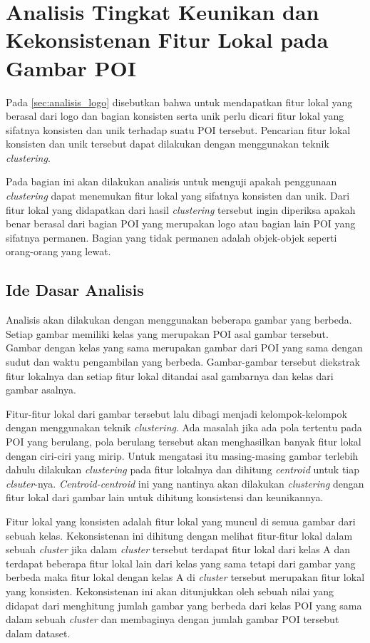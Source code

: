 \section{Analisis Tingkat Keunikan dan Kekonsistenan Fitur Lokal pada Gambar POI}
\label{sec:analisis_sifat}
Pada \ref{sec:analisis_logo} disebutkan bahwa untuk mendapatkan fitur lokal yang berasal dari logo dan bagian konsisten serta unik perlu dicari fitur lokal yang sifatnya konsisten dan unik terhadap suatu POI tersebut. Pencarian fitur lokal konsisten dan unik tersebut dapat dilakukan dengan menggunakan teknik \textit{clustering}. 

Pada bagian ini akan dilakukan analisis untuk menguji apakah penggunaan \textit{clustering} dapat menemukan fitur lokal yang sifatnya konsisten dan unik. Dari fitur lokal yang didapatkan dari hasil \textit{clustering} tersebut ingin diperiksa apakah benar berasal dari bagian POI yang merupakan logo atau bagian lain POI yang sifatnya permanen. Bagian yang tidak permanen adalah objek-objek seperti orang-orang yang lewat.

\subsection{Ide Dasar Analisis}
\label{subsec:ide_analisis_clustering}
Analisis akan dilakukan dengan menggunakan beberapa gambar yang berbeda. Setiap gambar memiliki kelas yang merupakan POI asal gambar tersebut. Gambar dengan kelas yang sama merupakan gambar dari POI yang sama dengan sudut dan waktu pengambilan yang berbeda. Gambar-gambar tersebut diekstrak fitur lokalnya dan setiap fitur lokal ditandai asal gambarnya dan kelas dari gambar asalnya. 

Fitur-fitur lokal dari gambar tersebut lalu dibagi menjadi kelompok-kelompok dengan menggunakan teknik \textit{clustering}. Ada masalah jika ada pola tertentu pada POI yang berulang, pola berulang tersebut akan menghasilkan banyak fitur lokal dengan ciri-ciri yang mirip. Untuk mengatasi itu masing-masing gambar terlebih dahulu dilakukan \textit{clustering} pada fitur lokalnya dan dihitung \textit{centroid} untuk tiap \textit{clsuter}-nya. \textit{Centroid-centroid} ini yang nantinya akan dilakukan \textit{clustering} dengan fitur lokal dari gambar lain untuk dihitung konsistensi dan keunikannya.

Fitur lokal yang konsisten adalah fitur lokal yang muncul di semua gambar dari sebuah kelas. Kekonsistenan ini dihitung dengan melihat fitur-fitur lokal dalam sebuah \textit{cluster} jika dalam \textit{cluster} tersebut terdapat fitur lokal dari kelas A dan terdapat beberapa fitur lokal lain dari kelas yang sama tetapi dari gambar yang berbeda maka fitur lokal dengan kelas A di \textit{cluster} tersebut merupakan fitur lokal yang konsisten. Kekonsistenan ini akan ditunjukkan oleh sebuah nilai yang didapat dari menghitung jumlah gambar yang berbeda dari kelas POI yang sama dalam sebuah \textit{cluster} dan membaginya dengan jumlah gambar POI tersebut dalam dataset.

